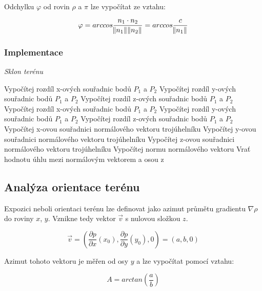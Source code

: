\documentclass{article}
\begin{document}
\begin{spacing}{1.5}
Odchylku $\varphi$ od rovin $\rho$ a $\pi$ lze vypočítat ze vztahu: 

$$\varphi = arccos \frac{n_1 \cdot n_2}{\norm {n_1}\norm {n_2}} = arccos \frac{c}{\norm {n_1}} $$

\newpage
\subsubsection*{Implementace}
\begin{algorithm}[h]
    \caption {\textit{Sklon terénu}}
    \begin{algorithmic}[1]
        \State Vypočítej rozdíl x-ových souřadnic bodů $P_1$ a $P_2$
        \State Vypočítej rozdíl y-ových souřadnic bodů $P_1$ a $P_2$
        \State Vypočítej rozdíl z-ových souřadnic bodů $P_1$ a $P_2$
        \State Vypočítej rozdíl x-ových souřadnic bodů $P_1$ a $P_2$
        \State Vypočítej rozdíl y-ových souřadnic bodů $P_1$ a $P_2$
        \State Vypočítej rozdíl z-ových souřadnic bodů $P_1$ a $P_2$
        \State Vypočítej x-ovou souřadnici normálového vektoru trojúhelníku
        \State Vypočítej y-ovou souřadnici normálového vektoru trojúhelníku
        \State Vypočítej z-ovou souřadnici normálového vektoru trojúhelníku
        \State Vypočítej normu normálového vektoru
        \State Vrať hodnotu úhlu mezi normálovým vektorem a osou z
    \end{algorithmic}
\end{algorithm}


\subsection{Analýza orientace terénu}
Expozici neboli orientaci terénu lze definovat jako azimut průmětu gradientu $\nabla \rho$ do roviny $x$, $y$. Vznikne tedy vektor $\vec{v}$ s nulovou složkou $z$.

$$\vec{v} = \left(\frac{\partial p}{\partial x}(x_0), \frac{\partial p}{\partial y}(y_0), 0 \right) = (a,b,0)$$

Azimut tohoto vektoru je měřen od osy $y$ a lze vypočítat pomocí vztahu: 

$$A = arctan (\frac{a}{b})$$



\end{spacing}
\end{document}
